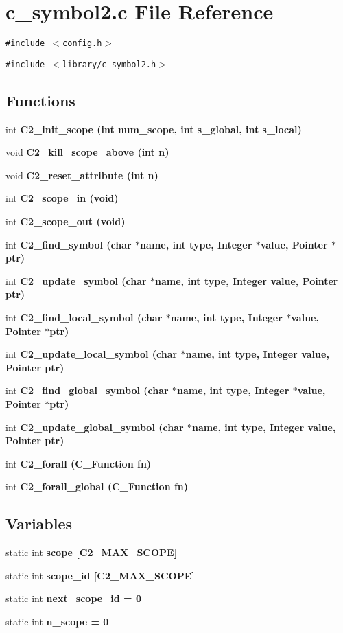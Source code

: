 \section{c\_\-symbol2.c File Reference}
\label{c__symbol2_8c}
{\tt \#include $<$config.h$>$}\par
{\tt \#include $<$library/c\_\-symbol2.h$>$}\par
\subsection*{Functions}
\begin{CompactItemize}
\item 
int \bf{C2\_\-init\_\-scope} (int num\_\-scope, int s\_\-global, int s\_\-local)
\item 
void \bf{C2\_\-kill\_\-scope\_\-above} (int n)
\item 
void \bf{C2\_\-reset\_\-attribute} (int n)
\item 
int \bf{C2\_\-scope\_\-in} (void)
\item 
int \bf{C2\_\-scope\_\-out} (void)
\item 
int \bf{C2\_\-find\_\-symbol} (char $\ast$\bf{name}, int type, \bf{Integer} $\ast$value, \bf{Pointer} $\ast$ptr)
\item 
int \bf{C2\_\-update\_\-symbol} (char $\ast$\bf{name}, int type, \bf{Integer} value, \bf{Pointer} ptr)
\item 
int \bf{C2\_\-find\_\-local\_\-symbol} (char $\ast$\bf{name}, int type, \bf{Integer} $\ast$value, \bf{Pointer} $\ast$ptr)
\item 
int \bf{C2\_\-update\_\-local\_\-symbol} (char $\ast$\bf{name}, int type, \bf{Integer} value, \bf{Pointer} ptr)
\item 
int \bf{C2\_\-find\_\-global\_\-symbol} (char $\ast$\bf{name}, int type, \bf{Integer} $\ast$value, \bf{Pointer} $\ast$ptr)
\item 
int \bf{C2\_\-update\_\-global\_\-symbol} (char $\ast$\bf{name}, int type, \bf{Integer} value, \bf{Pointer} ptr)
\item 
int \bf{C2\_\-forall} (\bf{C\_\-Function} fn)
\item 
int \bf{C2\_\-forall\_\-global} (\bf{C\_\-Function} fn)
\end{CompactItemize}
\subsection*{Variables}
\begin{CompactItemize}
\item 
static int \bf{scope} [C2\_\-MAX\_\-SCOPE]
\item 
static int \bf{scope\_\-id} [C2\_\-MAX\_\-SCOPE]
\item 
static int \bf{next\_\-scope\_\-id} = 0
\item 
static int \bf{n\_\-scope} = 0
\end{CompactItemize}


